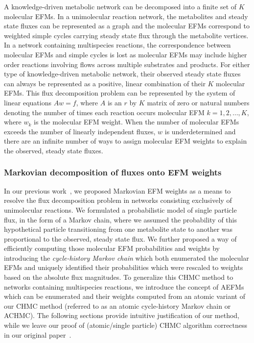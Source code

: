 \documentclass[12pt]{article}
\begin{document}

A knowledge-driven metabolic network can be decomposed into a finite set
of $K$ molecular EFMs. In a unimolecular reaction network, the metabolites
and steady state fluxes can be represented as a graph and the molecular
EFMs correspond to weighted simple cycles carrying steady state flux
through the metabolite vertices. In a network containing multispecies
reactions, the correspondence between molecular EFMs and simple cycles is
lost as molecular EFMs may include higher order reactions involving flows
across multiple substrates and products. For either type of
knowledge-driven metabolic network, their observed steady state fluxes can
always be represented as a positive, linear combination of their $K$
molecular EFMs. This flux decomposition problem can be represented by the
system of linear equations $Aw = f$, where $A$ is an $r$ by $K$ matrix of
zero or natural numbers denoting the number of times each reaction occurs
molecular EFM $k=1,2,\ldots,K$, where $w_k$ is the molecular EFM weight.
When the number of molecular EFMs exceeds the number of linearly
independent fluxes, $w$ is underdetermined and there are an infinite
number of ways to assign molecular EFM weights to explain the observed,
steady state fluxes.

\subsubsection*{Markovian decomposition of fluxes onto EFM weights} %

In our previous work~\citep{ChitpinJustinG2023AMct}, we proposed Markovian
EFM weights as a means to resolve the flux decomposition problem in
networks consisting exclusively of unimolecular reactions. We formulated
a probabilistic model of single particle flux, in the form of a Markov
chain, where we assumed the probability of this hypothetical particle
transitioning from one metabolite state to another was proportional to the
observed, steady state flux. We further proposed a way of efficiently
computing those molecular EFM probabilities and weights by introducing the
\emph{cycle-history Markov chain} which both enumerated the molecular EFMs
and uniquely identified their probabilities which were rescaled to weights
based on the absolute flux magnitudes. To generalize this CHMC method to
networks containing multispecies reactions, we introduce the concept of
AEFMs which can be enumerated and their weights computed from an atomic
variant of our CHMC method (referred to as an atomic cycle-history Markov
chain or ACHMC). The following sections provide intuitive justification of
our method, while we leave our proof of (atomic/single particle) CHMC
algorithm correctness in our original
paper~\citep{ChitpinJustinG2023AMct}.
\end{document}

